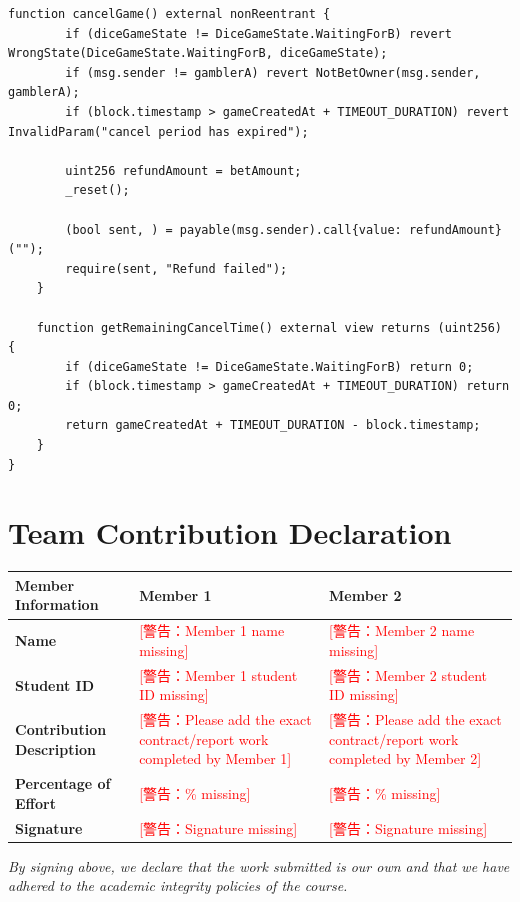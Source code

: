 \documentclass[10pt,a4paper]{article}
\newcommand{\fillin}[1]{\textcolor{red}{[警告：#1]}}
\begin{document}
\begin{lstlisting}[caption={Stage2.sol}]
    function cancelGame() external nonReentrant {
        if (diceGameState != DiceGameState.WaitingForB) revert WrongState(DiceGameState.WaitingForB, diceGameState);
        if (msg.sender != gamblerA) revert NotBetOwner(msg.sender, gamblerA);
        if (block.timestamp > gameCreatedAt + TIMEOUT_DURATION) revert InvalidParam("cancel period has expired");
        
        uint256 refundAmount = betAmount;
        _reset();
        
        (bool sent, ) = payable(msg.sender).call{value: refundAmount}("");
        require(sent, "Refund failed");
    }
    
    function getRemainingCancelTime() external view returns (uint256) {
        if (diceGameState != DiceGameState.WaitingForB) return 0;
        if (block.timestamp > gameCreatedAt + TIMEOUT_DURATION) return 0;
        return gameCreatedAt + TIMEOUT_DURATION - block.timestamp;
    }
}
\end{lstlisting}

\newpage
\section*{Team Contribution Declaration}
\begin{tabularx}{\textwidth}{|>{\raggedright\arraybackslash}p{}|X|X|}
\hline
\textbf{Member Information} & \textbf{Member 1} & \textbf{Member 2} \\
\hline
\textbf{Name} & \fillin{Member 1 name missing} & \fillin{Member 2 name missing} \\
\hline
\textbf{Student ID} & \fillin{Member 1 student ID missing} & \fillin{Member 2 student ID missing} \\
\hline
\textbf{Contribution Description} & \fillin{Please add the exact contract/report work completed by Member 1} & \fillin{Please add the exact contract/report work completed by Member 2} \\
\hline
\textbf{Percentage of Effort} & \fillin{\% missing} & \fillin{\% missing} \\
\hline
\textbf{Signature} & \fillin{Signature missing} & \fillin{Signature missing} \\
\hline
\end{tabularx}

\vspace{1em}
\textit{By signing above, we declare that the work submitted is our own and that we have adhered to the academic integrity policies of the course.}
\end{document}
